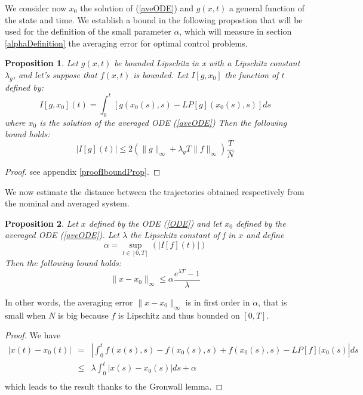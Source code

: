 \documentclass[a4paper,10pt]{article}
\newtheorem{proposition}{Proposition}
\begin{document}
We consider now $x_{0}$ the solution of (\ref{aveODE}) and $g(x,t)$ a 
general function of the state and time. We establish a bound in the 
following propostion that will be used for the definition of the 
small parameter $\alpha$, which will measure in section 
\ref{alphaDefinition} the averaging error for optimal control 
problems.

\begin{proposition}\label{IboundProp}
    Let $g(x,t)$ be bounded Lipschitz in x with a Lipschitz constant 
    $\lambda_{g}$, and let's suppose that $f(x,t)$ is bounded.
    Let $I[g,x_{0}]$ the function of $t$ defined by:
    \begin{equation}
        I[g,x_{0}](t)=\int_{0}^{t}\left[g(x_{0}(s),s)-LP[g](x_{0}(s),s)\right]ds
        \label{IdynODE}
    \end{equation}
    where $x_{0}$ is the solution of the averaged ODE (\ref{aveODE})
    Then the following bound holds:
    \begin{equation}
    |I[g](t)| \leq 2 (\|g\|_{\infty} + \lambda_{g}T  \|f\|_{\infty})\frac{T}{N}
    \label{BoundODE}
    \end{equation}
\end{proposition}
\begin{proof}
   see appendix \ref{proofIboundProp}.
\end{proof}

We now estimate the distance between the trajectories obtained 
respectively from the nominal and averaged system.
\begin{proposition}
    Let $x$ defined by the ODE (\ref{ODE}) and let $x_{0}$ defined by 
    the averaged ODE (\ref{aveODE}).
    Let $\lambda$ the Lipschitz constant of f in $x$ and define
    $$\alpha = \sup_{t\in[0,T]}(|I[f](t)|)$$ 
    Then the following bound holds:
    \begin{equation}
        \|x-x_{0}\|_{\infty} \leq \alpha \frac{e^{\lambda 
	T}-1}{\lambda}
    \end{equation}    
\end{proposition}
In other words, the averaging error $ \|x-x_{0}\|_{\infty}$ is in 
first order in $\alpha$, that is small when $N$ is big because 
$f$ is Lipschitz and thus bounded on $[0,T]$.
\begin{proof}
        We have
    \begin{eqnarray*}
        |x(t)-x_{0}(t)| & = & \left|\int_{0}^{t}
	f(x(s),s) -f(x_{0}(s),s)
	+  f(x_{0}(s),s) 
	- LP[f](x_{0}(s)\right| ds\\
         & \leq & \lambda\int_{0}^{t}|x(s)-x_{0}(s)|ds +\alpha\\
    \end{eqnarray*}
    which leads to the result thanks to the Gronwall lemma.

\end{proof}
\end{document}
